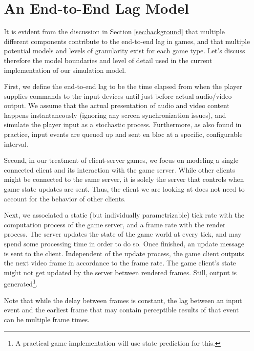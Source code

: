 \section{An End-to-End Lag Model}
\label{sec:model}

It is evident from the discussion in Section \ref{sec:background} 
that multiple different components contribute to 
the end-to-end lag in games, and that multiple potential models and 
levels of granularity exist for each game type.
Let's discuss therefore the model boundaries and level of detail 
used in the current implementation of our simulation model.

First, we define the end-to-end lag to be the time elapsed 
from when the player supplies commands to the input devices until just 
before actual audio/video output.
We assume that the actual presentation of 
audio and video content happens instantaneously  
(ignoring any screen synchronization issues), and simulate the player 
input as a stochastic process. %
Furthermore, as also found in practice, input events are queued up  
and sent en bloc at a specific, configurable interval.

Second, in our treatment of client-server games, we focus on modeling 
a single connected client and its interaction with the game server. 
While other clients might be connected to the same server, it is 
solely the server that controls when game state updates are sent. 
Thus, the client we are looking at does not need to account for the 
behavior of other clients.

Next, we associated a static (but individually parametrizable) tick 
rate with the computation process of the game server, and a frame rate 
with the render process. 
The server updates the state of the game world at every tick, and may 
spend some processing time in order to do so. Once finished, an update 
message is sent to the client.
Independent of the update process, the game client outputs the next 
video frame in accordance to the frame rate. The game client's state 
might not get updated by the server between rendered frames. Still, 
output is generated\footnote{A practical game implementation will use state prediction for this.}.

Note that while the delay between frames is constant, the lag between 
an input event and the earliest frame that may contain perceptible 
results of that event can be multiple frame times.

